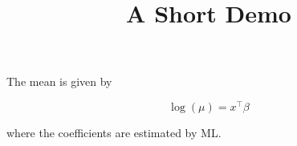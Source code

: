 \documentclass[article]{jss}
\title{A Short Demo}
\begin{document}
The mean is given by

\begin{equation} \label{eq:mean}
\log(\mu) = x^\top \beta
\end{equation}

where the coefficients are estimated by ML.
\end{document}
